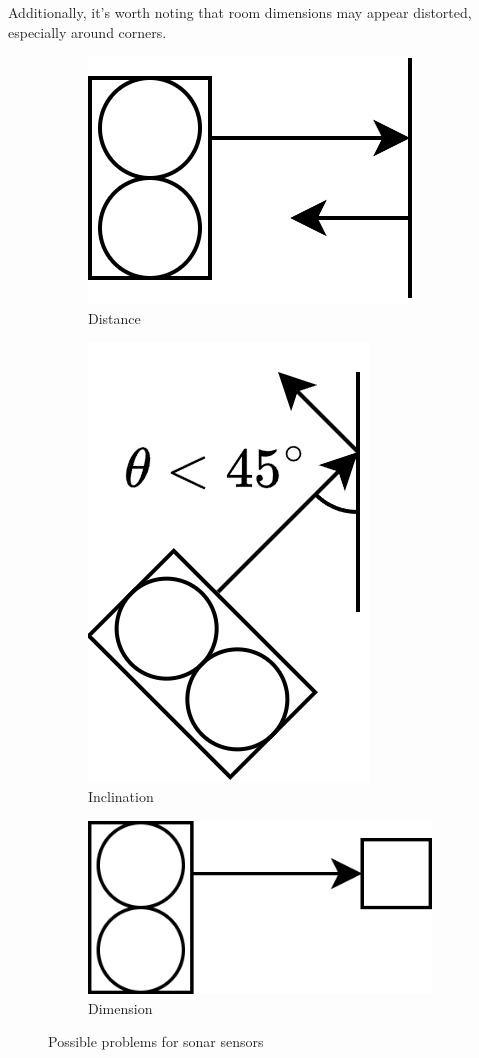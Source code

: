 Additionally, it's worth noting that room dimensions may appear distorted, especially around corners.
\begin{figure}[H]
    \centering
    \begin{subfigure}{0.3\textwidth}
        \centering
        \includegraphics[width=0.5\linewidth]{images/far.png} 
        \caption{Distance}
    \end{subfigure}
    \begin{subfigure}{0.3\textwidth}
        \centering
        \includegraphics[width=0.4\linewidth]{images/inclination.png}
        \caption{Inclination}
    \end{subfigure}
    \begin{subfigure}{0.3\textwidth}
        \centering
        \includegraphics[width=0.6\linewidth]{images/dimension.png} 
        \caption{Dimension}
    \end{subfigure}
    \caption{Possible problems for sonar sensors}
\end{figure}

